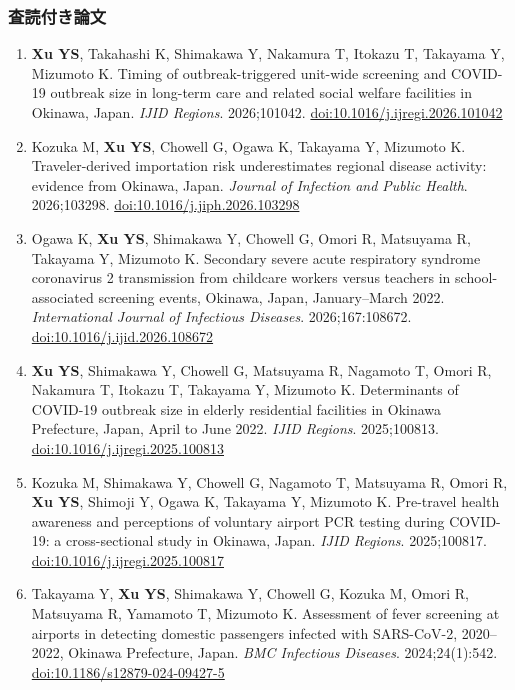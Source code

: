 \documentclass[a4paper,10pt]{article}
\newcommand{\me}{\textbf{Xu YS}}
\begin{document}
\subsubsection{査読付き論文}
\begin{enumerate}
  \item \me, Takahashi K, Shimakawa Y, Nakamura T, Itokazu T, Takayama Y, Mizumoto K. Timing of outbreak-triggered unit-wide screening and COVID-19 outbreak size in long-term care and related social welfare facilities in Okinawa, Japan. \textit{IJID Regions}. 2026;101042. \href{https://doi.org/10.1016/j.ijregi.2026.101042}{doi:10.1016/j.ijregi.2026.101042}
  \item Kozuka M, \me, Chowell G, Ogawa K, Takayama Y, Mizumoto K. Traveler-derived importation risk underestimates regional disease activity: evidence from Okinawa, Japan. \textit{Journal of Infection and Public Health}. 2026;103298. \href{https://doi.org/10.1016/j.jiph.2026.103298}{doi:10.1016/j.jiph.2026.103298}
  \item Ogawa K, \me, Shimakawa Y, Chowell G, Omori R, Matsuyama R, Takayama Y, Mizumoto K. Secondary severe acute respiratory syndrome coronavirus 2 transmission from childcare workers versus teachers in school-associated screening events, Okinawa, Japan, January–March 2022. \textit{International Journal of Infectious Diseases}. 2026;167:108672. \href{https://doi.org/10.1016/j.ijid.2026.108672}{doi:10.1016/j.ijid.2026.108672}
  \item \me, Shimakawa Y, Chowell G, Matsuyama R, Nagamoto T, Omori R, Nakamura T, Itokazu T, Takayama Y, Mizumoto K. Determinants of COVID-19 outbreak size in elderly residential facilities in Okinawa Prefecture, Japan, April to June 2022. \textit{IJID Regions}. 2025;100813. \href{https://doi.org/10.1016/j.ijregi.2025.100813}{doi:10.1016/j.ijregi.2025.100813}
  \item Kozuka M, Shimakawa Y, Chowell G, Nagamoto T, Matsuyama R, Omori R, \me, Shimoji Y, Ogawa K, Takayama Y, Mizumoto K. Pre-travel health awareness and perceptions of voluntary airport PCR testing during COVID-19: a cross-sectional study in Okinawa, Japan. \textit{IJID Regions}. 2025;100817. \href{https://doi.org/10.1016/j.ijregi.2025.100817}{doi:10.1016/j.ijregi.2025.100817}
  \item Takayama Y, \me, Shimakawa Y, Chowell G, Kozuka M, Omori R, Matsuyama R, Yamamoto T, Mizumoto K. Assessment of fever screening at airports in detecting domestic passengers infected with SARS-CoV-2, 2020–2022, Okinawa Prefecture, Japan. \textit{BMC Infectious Diseases}. 2024;24(1):542. \href{https://doi.org/10.1186/s12879-024-09427-5}{doi:10.1186/s12879-024-09427-5}
\end{enumerate}
\end{document}

